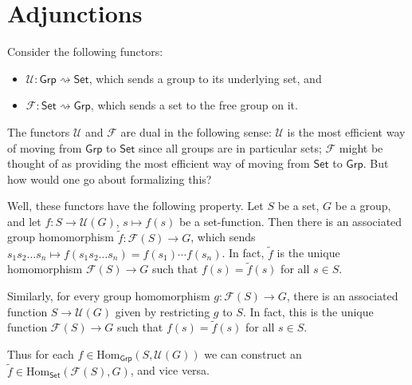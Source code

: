 \documentclass[a4paper,10pt]{scrreprt}
\newcommand{\Hom}{\mathrm{Hom}}
\theoremstyle{definition}
\theoremstyle{plain}
\theoremstyle{remark}
\begin{document}
\section{Adjunctions} \label{sec:adjunctions}
Consider the following functors:
\begin{itemize}
  \item $\mathcal{U}\colon \mathsf{Grp} \rightsquigarrow \mathsf{Set}$, which sends a group to its underlying set, and

  \item $\mathcal{F}\colon \mathsf{Set} \rightsquigarrow \mathsf{Grp}$, which sends a set to the free group on it.
\end{itemize}

The functors $\mathcal{U}$ and $\mathcal{F}$ are dual in the following sense: $\mathcal{U}$ is the most efficient way of moving from $\mathsf{Grp}$ to $\mathsf{Set}$ since all groups are in particular sets; $\mathcal{F}$ might be thought of as providing the most efficient way of moving from $\mathsf{Set}$ to $\mathsf{Grp}$. But how would one go about formalizing this?

Well, these functors have the following property. Let $S$ be a set, $G$ be a group, and let $f\colon S \to \mathcal{U}(G)$, $s \mapsto f(s)$ be a set-function. Then there is an associated group homomorphism $\tilde{f}\colon \mathcal{F}(S) \to G$, which sends $s_{1}s_{2}\dots s_{n} \mapsto f(s_{1}s_{2}\dots s_{n}) = f(s_{1})\cdots f(s_{n})$. In fact, $\tilde{f}$ is the unique homomorphism $\mathcal{F}(S) \to G$ such that $f(s) = \tilde{f}(s)$ for all $s \in S$. 

Similarly, for every group homomorphism $g\colon \mathcal{F}(S) \to G$, there is an associated function $S \to \mathcal{U}(G)$ given by restricting $g$ to $S$. In fact, this is the unique function $\mathcal{F}(S) \to G$ such that $f(s) = \tilde{f}(s)$ for all $s \in S$.

Thus for each $f \in \Hom_{\mathsf{Grp}}(S, \mathcal{U}(G))$ we can construct an $\tilde{f} \in \Hom_{\mathsf{Set}}(\mathcal{F}(S), G)$, and vice versa.
\end{document}
